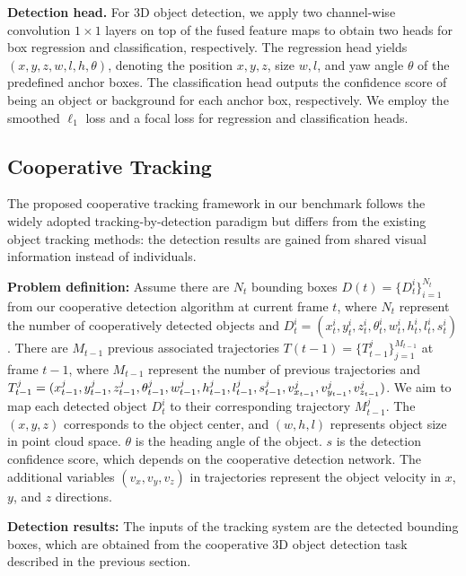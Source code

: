 \documentclass[10pt,twocolumn,letterpaper]{article}
\begin{document}
\textbf{Detection head.}
For 3D object detection, we apply two channel-wise convolution $1\times 1$ layers on top of the fused feature maps to obtain two heads for box regression and classification, respectively. The regression head yields $(x,y,z,w,l,h,\theta)$, denoting the position $x,y,z$, size $w,l$, and yaw angle $\theta$ of the predefined anchor boxes. The classification head outputs the confidence score of being an object or background for each anchor box, respectively.
We employ the smoothed $\ell_1$ loss and a focal loss for regression and classification heads.

\subsection{Cooperative Tracking}
The proposed cooperative tracking framework in our benchmark follows the widely adopted tracking-by-detection paradigm but differs from the existing object tracking methods: the detection results are gained from shared visual information instead of individuals.

\textbf{Problem definition:}  Assume there are $N_t$ bounding boxes $D(t) = \{D_t^i\}_{i=1}^{N_t} $ from our cooperative detection algorithm  at current frame $t$, where $N_t$ represent the number of cooperatively detected objects and $D_t^i = (x_t^i , y_t^i , z_t^i , \theta_t^i , w_t^i , h_t^i , l_t^i , s_t^i )$. There are $M_{t-1}$  previous associated trajectories $T(t-1) = \{T_{t-1}^j\}_{j=1}^{M_{t-1}}$ at frame $t-1$, where $M_{t-1}$ represent the number of previous trajectories and $T_{t-1}^j = (x_{t-1}^j , y_{t-1}^j , z_{t-1}^j , \theta_{t-1}^j , w_{t-1}^j , h_{t-1}^j , l_{t-1}^j , s_{t-1}^j, v_{x_{t-1}}^j, v_{y_{t-1}}^j, 
\\v_{z_{t-1}}^j)$. We aim to map each detected object $D_t^i$ to their corresponding trajectory $M_{t-1}^j$. The $(x, y, z)$ corresponds to the object center, and $(w, h, l)$ represents object size in point cloud space. $\theta$ is the heading angle of the object. $s$ is the detection confidence score, which depends on the cooperative detection network. The additional variables $(v_x, v_y, v_z)$ in trajectories represent the object velocity in $x$, $y$, and $z$ directions. 

\textbf{Detection results:} The inputs of the tracking system are the detected bounding boxes, which are obtained from the cooperative 3D object detection task described in the previous section.
\end{document}
